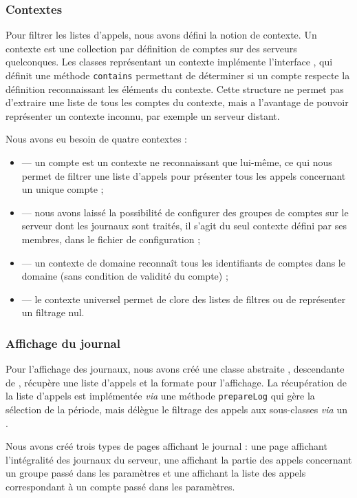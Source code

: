 \subsubsection{Contextes}

Pour filtrer les listes d’appels, nous avons défini la notion de contexte. Un contexte est une collection par définition de comptes sur des serveurs quelconques. Les classes représentant un contexte implémente l’interface , qui définit une méthode \texttt{contains} permettant de déterminer si un compte respecte la définition reconnaissant les éléments du contexte. Cette structure ne permet pas d’extraire une liste de tous les comptes du contexte, mais a l’avantage de pouvoir représenter un contexte inconnu, par exemple un serveur distant.

Nous avons eu besoin de quatre contextes :
\begin{itemize}
	\item {} — un compte est un contexte ne reconnaissant que lui-même, ce qui nous permet de filtrer une liste d’appels pour présenter tous les appels concernant un unique compte ;
	\item {} — nous avons laissé la possibilité de configurer des groupes de comptes sur le serveur dont les journaux sont traités, il s’agit du seul contexte défini par ses membres, dans le fichier de configuration ;
	\item {} — un contexte de domaine reconnaît tous les identifiants de comptes dans le domaine (sans condition de validité du compte) ;
	\item {} — le contexte universel permet de clore des listes de filtres ou de représenter un filtrage nul.
\end{itemize}

\subsubsection{Affichage du journal}

Pour l’affichage des journaux, nous avons créé une classe abstraite , descendante de , récupère une liste d’appels  et la formate pour l’affichage. La récupération de la liste d’appels est implémentée \textit{via} une méthode \texttt{prepareLog} qui gère la sélection de la période, mais délègue le filtrage des appels aux sous-classes \textit{via} un .

Nous avons créé trois types de pages affichant le journal : une page affichant l’intégralité des journaux du serveur, une affichant la partie des appels concernant un groupe passé dans les paramètres et une affichant la liste des appels correspondant à un compte passé dans les paramètres.

